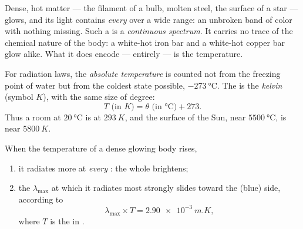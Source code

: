 \begin{definition}\label{def:g10:light-spectra:continuous}
Dense, hot matter --- the filament of a bulb, molten steel, the surface of
a star --- glows, and its light contains \emph{every}  over a
wide range: an unbroken band of color with nothing missing. Such a
 is a \emph{continuous spectrum}. It
carries no trace of the chemical nature of the body: a white-hot iron bar
and a white-hot copper bar glow alike. What it does encode --- entirely
--- is the temperature.
\end{definition}

\begin{definition}\label{def:g10:light-spectra:kelvin}
For radiation laws, the \emph{absolute temperature} is counted not from the freezing point of water but from
the coldest state possible,
$\qty{-273}{\degreeCelsius}$. The  is the \emph{kelvin}
(symbol $\unit{K}$), with the same size of degree:
\[
T \text{ (in } \unit{K}) = \theta \text{ (in } \unit{\degreeCelsius}) + 273 .
\]
Thus a room at $\qty{20}{\degreeCelsius}$ is at $\qty{293}{K}$, and the
surface of the Sun, near $\qty{5500}{\degreeCelsius}$, is near
$\qty{5800}{K}$.
\end{definition}

\begin{proposition}\label{prop:g10:light-spectra:wien}
When the temperature of a dense glowing body rises,
\begin{enumerate}
  \item it radiates more at \emph{every} : the whole 
        brightens;
  \item the  $\lambda_{\max}$ at which it radiates most
        strongly slides toward the  (blue) side,
        according to
        \[
        \lambda_{\max} \times T = \qty{2.90e-3}{m.K},
        \]
        where $T$ is the  in .
\end{enumerate}
\end{proposition}
\admitted

